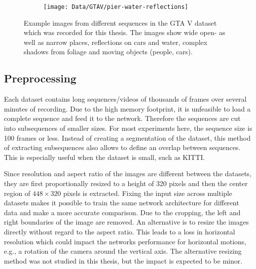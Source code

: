 \begin{figure}
\begin{subfigure}[b]{0.33\linewidth}
				\end{subfigure}\hfill%
				\begin{subfigure}[b]{0.33\linewidth}
					\centering
					\texttt{[image: Data/GTAV/pier-water-reflections]}
				\end{subfigure}%
				\caption[Example images from the GTA V dataset]
						{Example images from different sequences in the GTA V dataset which was recorded for this thesis.
						 The images show wide open- as well as narrow places, reflections on cars and water, complex shadows from foliage and moving objects (people, cars).
						 \label{fig:example-images-GTAV}}
			\end{figure}
			
			
		\subsection{Preprocessing}\label{sec:preprocessing}
			Each dataset contains long sequences/videos of thousands of frames over several minutes of recording.
			Due to the high memory footprint, it is unfeasible to load a complete sequence and feed it to the network.
			Therefore the sequences are cut into subsequences of smaller sizes. 
			For most experiments here, the sequence size is 100 frames or less.
			Instead of creating a segmentation of the dataset, this method of extracting subsequences also allows to define an overlap between sequences.
			This is especially useful when the dataset is small, such as KITTI.
			
			Since resolution and aspect ratio of the images are different between the datasets, they are first proportionally resized to a height of 320 pixels and then the center region of $448 \times 320$ pixels is extracted.
			Fixing the input size across multiple datasets makes it possible to train the same network architecture for different data and make a more accurate comparison.
			Due to the cropping, the left and right boundaries of the image are removed.
			An alternative is to resize the images directly without regard to the aspect ratio.
			This leads to a loss in horizontal resolution which could impact the networks performance for horizontal motions, e.g., a rotation of the camera around the vertical axis.
			The alternative resizing method was not studied in this thesis, but the impact is expected to be minor.
			
